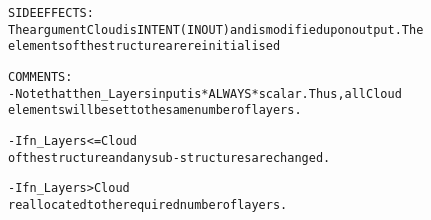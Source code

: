 \begin{alltt}
  SIDE EFFECTS:
        The argument Cloud is INTENT(IN OUT) and is modified upon output. The
        elements of the structure are reinitialised
 
  COMMENTS:
        - Note that the n_Layers input is *ALWAYS* scalar. Thus, all Cloud
          elements will be set to the same number of layers.
 
        - If n_Layers <= Cloud%Max_Layers, then only the dimension value
          of the structure and any sub-structures are changed.
 
        - If n_Layers > Cloud%Max_Layers, then the entire structure is
          reallocated to the required number of layers.
 
  \end{alltt}
